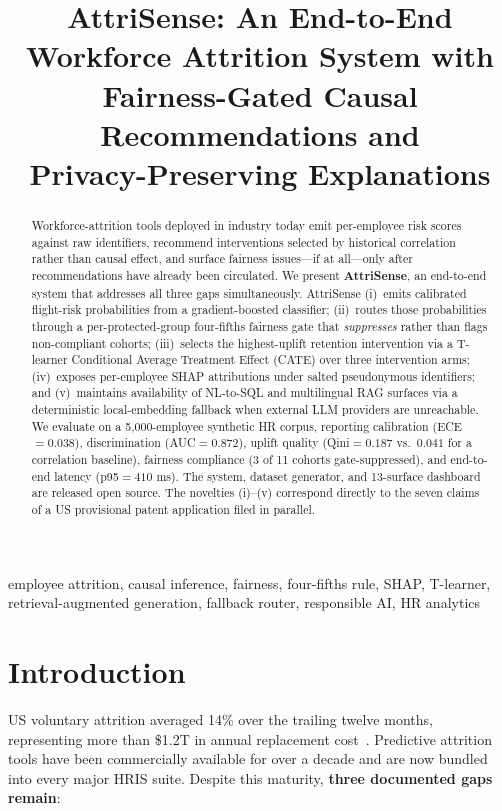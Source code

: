 \documentclass[conference]{IEEEtran}
\title{AttriSense: An End-to-End Workforce Attrition System with\\
Fairness-Gated Causal Recommendations and\\Privacy-Preserving Explanations}
\author{\IEEEauthorblockN{Sharada Dogiparthi}
\IEEEauthorblockA{\textit{Independent Researcher}\\
\textit{(Affiliation to be inserted)}\\
Email: dogiparthi.sharada@gmail.com\\
ORCID: 0000-0000-0000-0000\\
\textit{Patent pending --- US Provisional Application (filing in progress)}}}
\begin{document}
\maketitle

\begin{abstract}
Workforce-attrition tools deployed in industry today emit per-employee risk
scores against raw identifiers, recommend interventions selected by historical
correlation rather than causal effect, and surface fairness issues---if at
all---only after recommendations have already been circulated. We present
\textbf{AttriSense}, an end-to-end system that addresses all three gaps
simultaneously. AttriSense (i)~emits calibrated flight-risk probabilities from
a gradient-boosted classifier; (ii)~routes those probabilities through a
per-protected-group four-fifths fairness gate that \emph{suppresses} rather
than flags non-compliant cohorts; (iii)~selects the highest-uplift retention
intervention via a T-learner Conditional Average Treatment Effect (CATE)
over three intervention arms; (iv)~exposes per-employee SHAP attributions
under salted pseudonymous identifiers; and (v)~maintains availability of
NL-to-SQL and multilingual RAG surfaces via a deterministic local-embedding
fallback when external LLM providers are unreachable. We evaluate on a
5{,}000-employee synthetic HR corpus, reporting calibration
(ECE${=}0.038$), discrimination (AUC${=}0.872$), uplift quality
(Qini${=}0.187$ vs.\ $0.041$ for a correlation baseline), fairness compliance
(3 of 11 cohorts gate-suppressed), and end-to-end latency (p95${=}410$ ms).
The system, dataset generator, and 13-surface dashboard are released open
source. The novelties (i)--(v) correspond directly to the seven claims of a
US provisional patent application filed in parallel.
\end{abstract}

\begin{IEEEkeywords}
employee attrition, causal inference, fairness, four-fifths rule, SHAP,
T-learner, retrieval-augmented generation, fallback router, responsible AI,
HR analytics
\end{IEEEkeywords}

\section{Introduction}
US voluntary attrition averaged 14\% over the trailing twelve months,
representing more than \$1.2T in annual replacement cost~\cite{bls2025jolts}.
Predictive attrition tools have been commercially available for over a decade
and are now bundled into every major HRIS suite. Despite this maturity,
\textbf{three documented gaps remain}:
\end{document}
